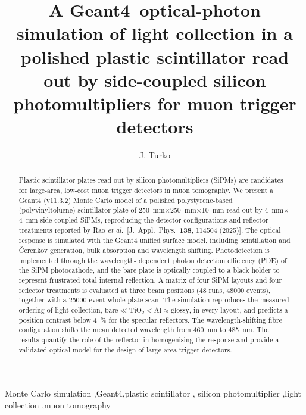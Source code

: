 \documentclass[3p]{elsarticle}
\newcommand{\gfour}{Geant4}
\newcommand{\sipm}{SiPM}
\begin{document}
\begin{frontmatter}

\title{A \gfour\ optical-photon simulation of light collection in a polished
plastic scintillator read out by side-coupled silicon photomultipliers for
muon trigger detectors}

\author[label1]{J. Turko}
\ead{}

\address[label1]{Institution, Address, City, Country}

\begin{abstract}
Plastic scintillator plates read out by silicon photomultipliers (\sipm{}s)
are candidates for large-area, low-cost muon trigger detectors in muon
tomography. We present a \gfour{} (v11.3.2) Monte Carlo model of a polished
polystyrene-based (polyvinyltoluene) scintillator plate of
\SI{250}{\milli\meter}$\times$\SI{250}{\milli\meter}$\times$\SI{10}{\milli\meter}
read out by \SI{4}{\milli\meter}$\times$\SI{4}{\milli\meter} side-coupled
\sipm{}s, reproducing the detector configurations and reflector treatments
reported by Rao \emph{et al.}\ [J.~Appl.\ Phys.\ \textbf{138}, 114504 (2025)].
The optical response is simulated with the \gfour{} unified surface model,
including scintillation and \v{C}erenkov generation, bulk absorption and
wavelength shifting. Photodetection is implemented through the wavelength-
dependent photon detection efficiency (PDE) of the \sipm{} photocathode, and
the bare plate is optically coupled to a black holder to represent frustrated
total internal reflection. A matrix of four \sipm{} layouts and four reflector
treatments is evaluated at three beam positions (48 runs, \num{48000} events),
together with a \num{25000}-event whole-plate scan. The simulation reproduces
the measured ordering of light collection,
$\text{bare} \ll \text{TiO}_2 < \text{Al} \approx \text{glossy}$, in every
layout, and predicts a position contrast below \SI{4}{\percent} for the
specular reflectors. The wavelength-shifting fibre configuration shifts the
mean detected wavelength from \SI{460}{\nano\meter} to \SI{485}{\nano\meter}.
The results quantify the role of the reflector in homogenising the response and
provide a validated optical model for the design of large-area trigger
detectors.
\end{abstract}

\begin{keyword}
Monte Carlo simulation \sep \gfour \sep plastic scintillator \sep
silicon photomultiplier \sep light collection \sep muon tomography
\end{keyword}

\end{frontmatter}
\end{document}
